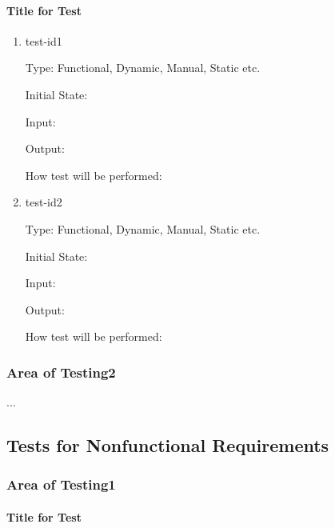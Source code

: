 \documentclass[12pt, titlepage]{article}
\begin{document}
\paragraph{Title for Test}

\begin{enumerate}

\item{test-id1\\}

Type: Functional, Dynamic, Manual, Static etc.
					
Initial State: 
					
Input: 
					
Output: 
					
How test will be performed: 
					
\item{test-id2\\}

Type: Functional, Dynamic, Manual, Static etc.
					
Initial State: 
					
Input: 
					
Output: 
					
How test will be performed: 

\end{enumerate}

\subsubsection{Area of Testing2}

...

\subsection{Tests for Nonfunctional Requirements}

\subsubsection{Area of Testing1}
		
\paragraph{Title for Test}
\end{document}
